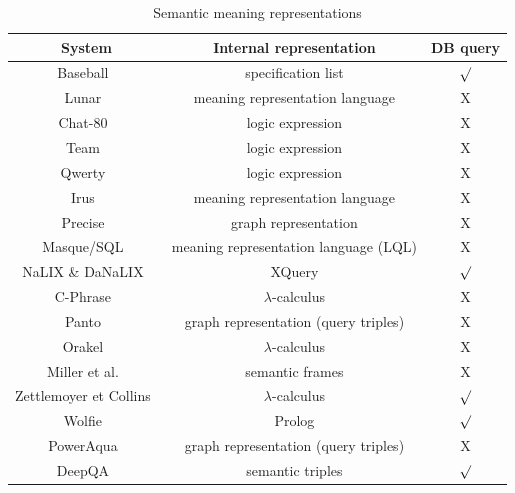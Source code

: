 \documentclass[10pt,journal,letterpaper,compsoc]{IEEEtran}
\begin{document}
\begin{table}[h!]
\centering
\begin{tabular}{|c|c|c|}\hline
{\bf System} & {\bf Internal representation} & {\bf DB query}\\\hline\hline
{\sc Baseball}~\cite{Green:1961:BAQ:1460690.1460714} & specification list &
$\surd$\\\hline
{\sc Lunar}~\cite{Woods:1973:PNL:1499586.1499695} & meaning representation
language & X\\\hline 
{\sc Chat-80}~\cite{Warren:1982:EEA:972942.972944} &
logic expression & X\\\hline
{\sc Team}~\cite{Grosz:1987:TED:25672.25674} & logic expression & X\\\hline
{\sc Qwerty}~\cite{Nelken:2000:QTD:992730.992808} & logic expression & X\\\hline
{\sc Irus}~\cite{Bates:1983:IRU:511793.511804} & meaning representation language
& X\\\hline
{\sc Precise}~\cite{Popescu:2003:TTN:604045.604070} & graph representation &
X\\\hline
{\sc Masque/SQL}~\cite{Androutsopoulos93masque} & meaning representation
language (LQL) & X \\\hline 
{\sc NaLIX} \& {\sc
DaNaLIX}~\cite{Li:2005:NIN:1066157.1066281,Li:2007:DDN:1247480.1247643} & XQuery
& $\surd$\\\hline 
{\sc C-Phrase}~\cite{Minock:2010:CSB:1715942.1716190} & $\lambda$-calculus & X
\\\hline
{\sc Panto}~\cite{Wang:2007:PPN:1419662.1419706} & graph representation (query
triples) & X\\\hline 
{\sc Orakel}~\cite{Cimiano:2007:PNL:1216295.1216330} & $\lambda$-calculus &
X\\\hline
Miller et al.~\cite{Miller:1996:FSA:981863.981871} &
semantic frames & X\\\hline 
Zettlemoyer et
Collins~\cite{DBLP:conf/uai/ZettlemoyerC05} & $\lambda$-calculus &
$\surd$\\\hline 
{\sc Wolfie}~\cite{Thompson:2003:AWM:1622420.1622421} & Prolog & $\surd$
\\\hline {\sc PowerAqua}~\cite{DBLP:conf/esws/LopezMU06} & graph representation
(query triples) & X\\\hline
{\sc DeepQA}~\cite{FerrucciBCFGKLMNPSW10} & semantic triples & $\surd$\\\hline
\end{tabular}
\caption{Semantic meaning representations}
\label{tab:semantic-meaning-representation}
\end{table}
\end{document}

